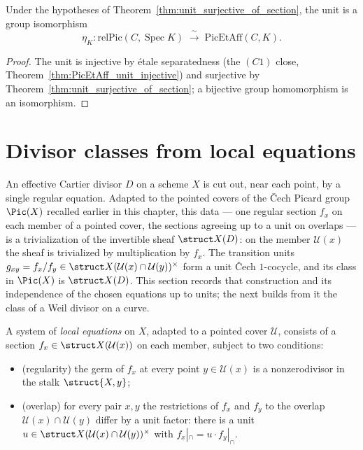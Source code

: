 \begin{theorem}
  \label{thm:unitEquiv_of_section}
  \leanok
  Under the hypotheses of Theorem~\ref{thm:unit_surjective_of_section}, the unit is a group
  isomorphism
  \[
    \eta_K \colon \mathrm{relPic}(C, \operatorname{Spec} K) \;\xrightarrow{\ \sim\ }\;
      \mathrm{PicEtAff}(C, K).
  \]
\end{theorem}
\begin{proof}
  \leanok
  The unit is injective by \'etale separatedness (the \((C1)\) close,
  Theorem~\ref{thm:PicEtAff_unit_injective}) and surjective by
  Theorem~\ref{thm:unit_surjective_of_section}; a bijective group homomorphism is an isomorphism.
\end{proof}

\section{Divisor classes from local equations}

An effective Cartier divisor \(D\) on a scheme \(X\) is cut out, near each point, by a single
regular equation. Adapted to the pointed covers of the \v Cech Picard group \(\Pic(X)\) recalled
earlier in this chapter, this data --- one regular section \(f_x\) on each member
of a pointed cover, the sections agreeing up to a unit on overlaps --- is a trivialization of the
invertible sheaf \(\struct X(D)\): on the member \(\mathcal U(x)\) the sheaf is trivialized by
multiplication by \(f_x\). The transition units \(g_{xy} = f_x/f_y \in \struct
X(\mathcal U(x) \cap \mathcal U(y))^{\times}\) form a unit \v Cech \(1\)-cocycle, and its class in
\(\Pic(X)\) is \(\struct X(D)\). This section records that construction and its independence of
the chosen equations up to units; the next builds from it the class of a Weil divisor on a curve.

\begin{definition}
  \label{def:localEquations}
  \leanok
  A system of \emph{local equations} on \(X\), adapted to a pointed cover \(\mathcal U\), consists
  of a section \(f_x \in \struct X(\mathcal U(x))\) on each member, subject to two conditions:
  \begin{itemize}
    \item (regularity) the germ of \(f_x\) at every point \(y \in \mathcal U(x)\) is a
      nonzerodivisor in the stalk \(\struct{X,y}\);
    \item (overlap) for every pair \(x, y\) the restrictions of \(f_x\) and \(f_y\) to the overlap
      \(\mathcal U(x) \cap \mathcal U(y)\) differ by a unit factor: there is a unit \(u \in
      \struct X(\mathcal U(x) \cap \mathcal U(y))^{\times}\) with \(f_x|_{\cap} = u \cdot
      f_y|_{\cap}\).
  \end{itemize}
\end{definition}

